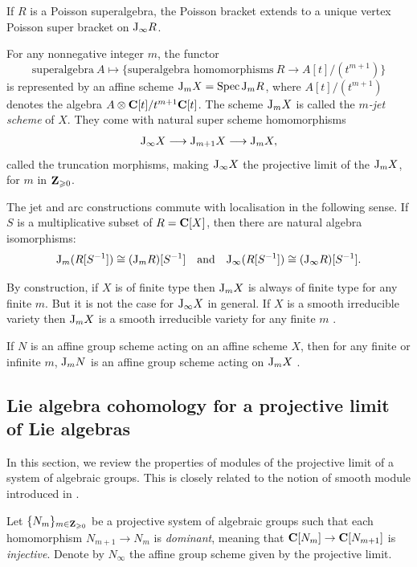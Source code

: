 \begin{proposition}
	If $R$ is a Poisson superalgebra, the Poisson bracket extends to a unique vertex Poisson super bracket on $\mathrm{J}_\infty R$.
\end{proposition}

For any nonnegative integer $m$, the functor
\[ \text{superalgebra} ~ A \longmapsto \{\text{superalgebra homomorphisms} ~  R \rightarrow  A[t]/(t^{m+1})\} \]
is represented by an affine scheme $\mathrm{J}_m X = \operatorname{Spec} \mathrm{J}_m R$, where $A[t]/(t^{m+1})$ denotes the algebra $A \otimes \mathbf{C}[t] / t^{m + 1} \mathbf{C}[t]$. The scheme $\mathrm{J}_m X$ is called the \emph{$m$-jet scheme} of $X$. They come with natural super scheme homomorphisms
\[ \mathrm{J}_\infty X \longrightarrow \mathrm{J}_{m+1} X \longrightarrow \mathrm{J}_{m} X, \]
called the truncation morphisms, making $\mathrm{J}_\infty X$ the projective limit of the $\mathrm{J}_m X$, for $m$ in $\mathbf{Z}_{\geqslant 0}$.

The jet and arc constructions commute with localisation in the following sense. If $S$ is a multiplicative subset of $R = \mathbf{C}[X]$, then there are natural algebra isomorphisms:
\[ \mathrm{J}_m(R[S^{-1}]) \cong (\mathrm{J}_mR)[S^{-1}] \quad \text{and} \quad \mathrm{J}_\infty(R[S^{-1}]) \cong (\mathrm{J}_\infty R)[S^{-1}].  \]

By construction, if $X$ is of finite type then $\mathrm{J}_m X$ is always of finite type for any finite $m$. But it is not the case for $\mathrm{J}_\infty X$ in general. If $X$ is a smooth irreducible variety then $\mathrm{J}_m X$ is a smooth irreducible variety for any finite $m$ \cite[Corollary~2.11]{chambert2018motivic}. 

If $N$ is an affine group scheme acting on an affine scheme $X$, then for any finite or infinite $m$, $\mathrm{J}_m N$ is an affine group scheme acting on $\mathrm{J}_m X$ \cite[Remark 2.8]{ein2009jet}. 

\subsection{Lie algebra cohomology for a projective limit of Lie algebras}

In this section, we review the properties of modules of the projective limit of a system of algebraic groups. This is closely related to the notion of smooth module introduced in \cite[Section 1.9]{kazhdan1993tensor}.

Let $\{N_m\}_{m \in \mathbf{Z}_{\geqslant 0}}$ be a projective system of algebraic groups such that each homomorphism $N_{m + 1} \rightarrow N_m$ is \emph{dominant}, meaning that $\mathbf{C}[N_m] \rightarrow \mathbf{C}[N_{m+1}]$ is \emph{injective}. Denote by $N_\infty$ the affine group scheme given by the projective limit.

